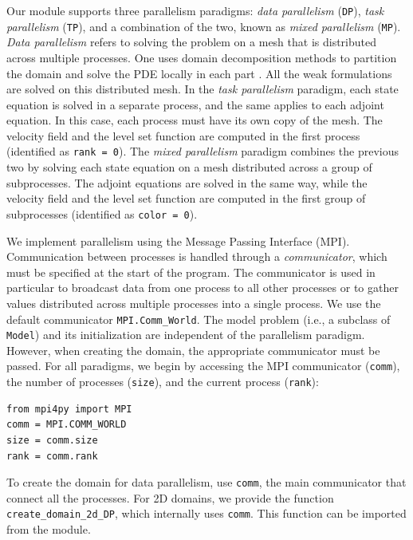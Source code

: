 \documentclass[iicol,pdflatex,sn-mathphys-ay]{sn-jnl}%
\theoremstyle{thmstyleone}%
\theoremstyle{thmstyletwo}%
\theoremstyle{thmstylethree}%
\begin{document}
Our module supports three parallelism paradigms:
\textit{data parallelism} (\texttt{DP}),
\textit{task parallelism} (\texttt{TP}), and a combination of the two,
known as \textit{mixed parallelism} (\texttt{MP}).
\textit{Data parallelism} refers to solving the problem on a mesh
that is distributed across multiple processes.
One uses domain decomposition methods to partition the domain
and solve the PDE locally in each part \cite{MR2104179}. 
All the weak formulations are solved on this distributed mesh.
In the \textit{task parallelism} paradigm, each state equation is solved
in a separate process, and the same applies to each adjoint equation.
In this case, each process must have its own copy of the mesh.
The velocity field and the level set function are computed
in the first process (identified as \texttt{rank = 0}).
The \textit{mixed parallelism} paradigm combines the previous two by
solving each state equation on a mesh distributed across a group
of subprocesses. The adjoint equations are solved in the same 
way, while the velocity field and the level set function are computed
in the first group of subprocesses (identified as \texttt{color = 0}).

We implement parallelism using the Message Passing Interface (MPI). 
Communication between processes is handled through a {\it communicator},
which must be specified at the start of the program.
The communicator is used in particular to broadcast data
from one process to all other processes or to gather values distributed
across multiple processes into a single process.
We use the default communicator \texttt{MPI.Comm\_World}.
The model problem (i.e., a subclass of \texttt{Model})
and its initialization are independent of the parallelism paradigm.
However, when creating the domain, the appropriate communicator must be passed.
For all paradigms, we begin by accessing the MPI communicator (\texttt{comm}),
the number of processes (\texttt{size}),
and the current process (\texttt{rank}):
\begin{lstlisting}
from mpi4py import MPI
comm = MPI.COMM_WORLD
size = comm.size
rank = comm.rank
\end{lstlisting}

To create the domain for data parallelism, use \texttt{comm},
the main communicator that connect all the processes.
For 2D domains, we provide the function
\texttt{create\_domain\_2d\_DP}, which internally uses \texttt{comm}.
This function can be imported from the module.
\end{document}

